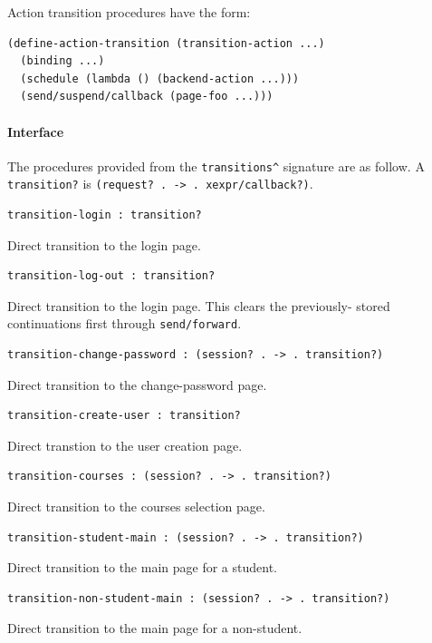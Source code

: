 \documentclass[a4paper]{article}
\begin{document}
Action transition procedures have the form:

\begin{verbatim}
(define-action-transition (transition-action ...)
  (binding ...)
  (schedule (lambda () (backend-action ...)))
  (send/suspend/callback (page-foo ...)))
\end{verbatim}

\paragraph{Interface}\label{para:transitions-interface}

The procedures provided from the \verb|transitions^| signature are as follow.
A \verb|transition?| is \verb|(request? . -> . xexpr/callback?)|.

\begin{verbatim}
transition-login : transition?
\end{verbatim}
Direct transition to the login page.

\begin{verbatim}
transition-log-out : transition?
\end{verbatim}
Direct transition to the login page. This clears the previously-
stored continuations first through \verb|send/forward|.

\begin{verbatim}
transition-change-password : (session? . -> . transition?)
\end{verbatim}
Direct transition to the change-password page.

\begin{verbatim}
transition-create-user : transition?
\end{verbatim}
Direct transtion to the user creation page.

\begin{verbatim}
transition-courses : (session? . -> . transition?)
\end{verbatim}
Direct transition to the courses selection page.

\begin{verbatim}
transition-student-main : (session? . -> . transition?)
\end{verbatim}
Direct transition to the main page for a student.

\begin{verbatim}
transition-non-student-main : (session? . -> . transition?)
\end{verbatim}
Direct transition to the main page for a non-student.
\end{document}

